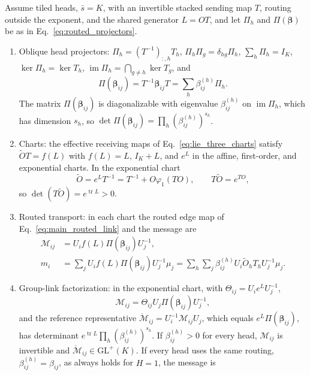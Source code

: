 \documentclass[twoside,11pt]{article}
\begin{document}
\begin{theorem}
\label{thm:routed_transport}
Assume tiled heads, $\bar s=K$, with an invertible stacked sending map $T$, routing outside the exponent, and the shared generator $L=OT$, and let $\Pi_h$ and $\Pi(\boldsymbol\beta)$ be as in Eq.~\eqref{eq:routed_projectors}.
\begin{enumerate}
\item Oblique head projectors: $\Pi_h=(T^{-1})_{:,h}T_h$, $\Pi_h\Pi_g=\delta_{hg}\Pi_h$, $\sum_h\Pi_h=I_K$, $\ker\Pi_h=\ker T_h$, $\operatorname{im}\Pi_h=\bigcap_{g\ne h}\ker T_g$, and
\begin{equation}
\Pi(\boldsymbol\beta_{ij})=T^{-1}\boldsymbol\beta_{ij}T=\sum_h\beta_{ij}^{(h)}\Pi_h.
\label{eq:lie_order_zero}
\end{equation}
The matrix $\Pi(\boldsymbol\beta_{ij})$ is diagonalizable with eigenvalue $\beta_{ij}^{(h)}$ on $\operatorname{im}\Pi_h$, which has dimension $s_h$, so $\det\Pi(\boldsymbol\beta_{ij})=\prod_h(\beta_{ij}^{(h)})^{s_h}$.
\item Charts: the effective receiving maps of Eq.~\eqref{eq:lie_three_charts} satisfy $\widetilde OT=f(L)$ with $f(L)=L$, $I_K+L$, and $e^{L}$ in the affine, first-order, and exponential charts. In the exponential chart
\begin{equation}
\widetilde O=e^{L}T^{-1}=T^{-1}+O\varphi_1(TO),\qquad
T\widetilde O=e^{TO},
\label{eq:lie_resummed}
\end{equation}
so $\det(T\widetilde O)=e^{\operatorname{tr}L}>0$.
\item Routed transport: in each chart the routed edge map of Eq.~\eqref{eq:main_routed_link} and the message are
\begin{equation}
\begin{aligned}
\mathcal M_{ij}&=U_if(L)\Pi(\boldsymbol\beta_{ij})U_j^{-1},\\
m_i&=\sum_jU_if(L)\Pi(\boldsymbol\beta_{ij})U_j^{-1}\mu_j
=\sum_h\sum_j\beta_{ij}^{(h)}U_i\widetilde O_hT_hU_j^{-1}\mu_j.
\end{aligned}
\label{eq:routed_transport}
\end{equation}
\item Group-link factorization: in the exponential chart, with $\Theta_{ij}=U_ie^{L}U_j^{-1}$,
\begin{equation}
\mathcal M_{ij}=\Theta_{ij}U_j\Pi(\boldsymbol\beta_{ij})U_j^{-1},
\label{eq:routed_factorization}
\end{equation}
and the reference representative $\mathring{\mathcal M}_{ij}=U_i^{-1}\mathcal M_{ij}U_j$, which equals $e^{L}\Pi(\boldsymbol\beta_{ij})$, has determinant $e^{\operatorname{tr}L}\prod_h(\beta_{ij}^{(h)})^{s_h}$. If $\beta_{ij}^{(h)}>0$ for every head, $\mathcal M_{ij}$ is invertible and $\mathring{\mathcal M}_{ij}\in\mathrm{GL}^+(K)$. If every head uses the same routing, $\beta_{ij}^{(h)}=\beta_{ij}$, as always holds for $H=1$, the message is

\end{enumerate}
\end{theorem}
\end{document}
